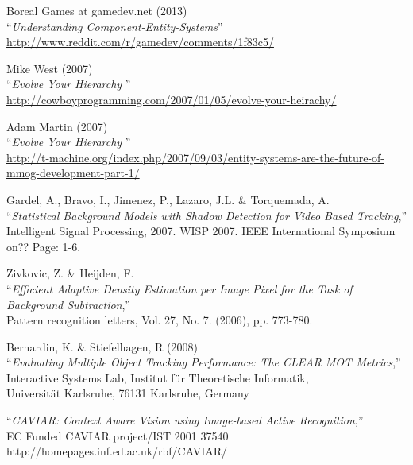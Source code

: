 \begin{thebibliography}{9}
	Boreal Games at gamedev.net (2013) \\ 
	``\textit{Understanding Component-Entity-Systems}'' \\
	\href{http://www.reddit.com/r/gamedev/comments/1f83c5/}{http://www.reddit.com/r/gamedev/comments/1f83c5/}
	
	Mike West (2007) \\ 
	``\textit{Evolve Your Hierarchy }'' \\
	\href{http://cowboyprogramming.com/2007/01/05/evolve-your-heirachy/}{http://cowboyprogramming.com/2007/01/05/evolve-your-heirachy/}

	Adam Martin (2007) \\ 
	``\textit{Evolve Your Hierarchy }'' \\
	\href{http://t-machine.org/index.php/2007/09/03/entity-systems-are-the-future-of-mmog-development-part-1/}{http://t-machine.org/index.php/2007/09/03/entity-systems-are-the-future-of-mmog-development-part-1/}
	

	Gardel, A., Bravo, I., Jimenez, P., Lazaro, J.L. \& Torquemada, A.\\
	``\textit{Statistical Background Models with Shadow Detection for Video Based Tracking},''\\ Intelligent Signal Processing, 2007. WISP 2007. IEEE International Symposium on?? Page: 1-6.
	
	Zivkovic, Z. \& Heijden, F.\\
	``\textit{Efficient Adaptive Density Estimation per Image Pixel for the Task of Background Subtraction},''\\
	Pattern recognition letters, Vol. 27, No. 7. (2006), pp. 773-780.

	Bernardin, K. \& Stiefelhagen, R (2008)\\
	``\textit{Evaluating Multiple Object Tracking Performance: The CLEAR MOT Metrics},''\\
	Interactive Systems Lab, Institut für Theoretische Informatik,\\
	Universität Karlsruhe, 76131 Karlsruhe, Germany
	
	``\textit{CAVIAR: Context Aware Vision using Image-based Active Recognition},''\\
	EC Funded CAVIAR project/IST 2001 37540\\
	http://homepages.inf.ed.ac.uk/rbf/CAVIAR/
	

\end{thebibliography}
